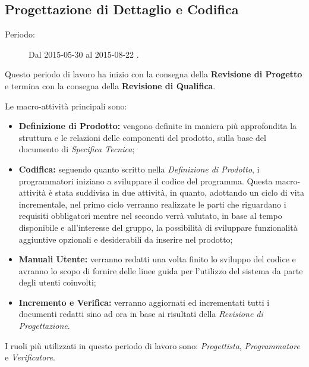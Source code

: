 \newpage
\subsection{Progettazione di Dettaglio e Codifica}
\begin{description}
	\item[Periodo:] Dal 2015-05-30 al 2015-08-22 .
\end{description}
Questo periodo di lavoro ha inizio con la consegna della \textbf{Revisione di Progetto} e termina con la consegna della \textbf{Revisione di Qualifica}. 

\noindent Le macro-attività principali sono:
\begin{itemize}
	\item \textbf{Definizione di Prodotto:} vengono definite in maniera più approfondita la struttura e le relazioni delle componenti del prodotto, sulla base del documento di \textit{Specifica Tecnica};
	\item \textbf{Codifica:} seguendo quanto scritto nella \textit{Definizione di Prodotto}, i programmatori iniziano a sviluppare il codice del programma. Questa macro-attività è stata suddivisa in due attività, in quanto, adottando un ciclo di vita incrementale, nel primo ciclo verranno realizzate le parti che riguardano i requisiti obbligatori mentre nel secondo verrà valutato, in base al tempo disponibile e all'interesse del gruppo, la possibilità di sviluppare funzionalità aggiuntive opzionali e desiderabili da inserire nel prodotto;
	\item \textbf{Manuali Utente:} verranno redatti una volta finito lo sviluppo del codice e avranno lo scopo di fornire delle linee guida per l'utilizzo del sistema da parte degli utenti coinvolti;
	\item \textbf{Incremento e Verifica:} verranno aggiornati ed incrementati tutti i documenti redatti sino ad ora in base ai risultati della \textit{Revisione di Progettazione}.
\end{itemize}
I ruoli più utilizzati in questo periodo di lavoro sono: \textit{Progettista}, \textit{Programmatore} e \textit{Verificatore}. 
